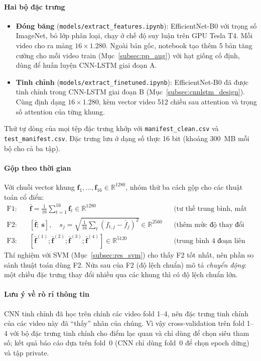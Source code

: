 \paragraph*{Hai bộ đặc trưng}
\begin{itemize}
  \item \textbf{Đóng băng} (\texttt{models/extract\_features.ipynb}): EfficientNet-B0 với trọng số ImageNet, bỏ lớp phân loại, chạy ở chế độ suy luận trên GPU Tesla T4. Mỗi video cho ra mảng $16\times1.280$. Ngoài bản gốc, notebook tạo thêm 5 bản tăng cường cho mỗi video train (Mục~\ref{subsec:pp_aug}) với hạt giống cố định, dùng để huấn luyện CNN-LSTM giai đoạn A.
  \item \textbf{Tinh chỉnh} (\texttt{models/extract\_finetuned.ipynb}): EfficientNet-B0 đã được tinh chỉnh trong CNN-LSTM giai đoạn B (Mục~\ref{subsec:cnnlstm_design}). Cùng định dạng $16\times1.280$, kèm vector video 512 chiều sau attention và trọng số attention của từng khung.
\end{itemize}
Thứ tự dòng của mọi tệp đặc trưng khớp với \texttt{manifest\_clean.csv} và \texttt{test\_manifest.csv}. Đặc trưng lưu ở dạng số thực 16 bit (khoảng 300~MB mỗi bộ cho cả ba tập).

\paragraph*{Gộp theo thời gian} Với chuỗi vector khung $\mathbf{f}_1,\dots,\mathbf{f}_{16}\in\mathbb{R}^{1280}$, nhóm thử ba cách gộp cho các thuật toán cổ điển:
\begin{align}
  \text{F1:}\quad & \bar{\mathbf{f}} = \frac{1}{16}\sum_{t=1}^{16}\mathbf{f}_t \in\mathbb{R}^{1280} && \text{(tư thế trung bình, mất thứ tự)}\\
  \text{F2:}\quad & [\bar{\mathbf{f}};\ \mathbf{s}],\quad s_j=\sqrt{\tfrac{1}{16}\textstyle\sum_t(f_{t,j}-\bar{f}_j)^2} \in\mathbb{R}^{2560} && \text{(thêm mức độ thay đổi theo thời gian)}\\
  \text{F3:}\quad & [\bar{\mathbf{f}}^{(1)};\bar{\mathbf{f}}^{(2)};\bar{\mathbf{f}}^{(3)};\bar{\mathbf{f}}^{(4)}] \in\mathbb{R}^{5120} && \text{(trung bình 4 đoạn liên tiếp: đầu, giữa, cuối)}
\end{align}
Thí nghiệm với SVM (Mục~\ref{subsec:res_svm}) cho thấy F2 tốt nhất, nên phần so sánh thuật toán dùng F2. Nửa sau của F2 (độ lệch chuẩn) mô tả \emph{chuyển động}: một chiều đặc trưng thay đổi nhiều qua các khung thì có độ lệch chuẩn lớn.

\paragraph*{Lưu ý về rò rỉ thông tin} CNN tinh chỉnh đã học trên chính các video fold 1--4, nên đặc trưng tinh chỉnh của các video này đã ``thấy'' nhãn của chúng. Vì vậy cross-validation trên fold 1--4 với bộ đặc trưng tinh chỉnh cho điểm lạc quan và chỉ dùng để chọn siêu tham số; kết quả báo cáo dựa trên fold~0 (CNN chỉ dùng fold~0 để chọn epoch dừng) và tập private.

